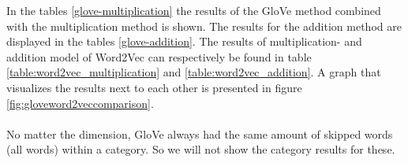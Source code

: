 
In the tables \ref{glove-multiplication} the results of the GloVe method combined with the multiplication method is shown. The results for the addition method are displayed in the tables \ref{glove-addition}. The results of multiplication- and addition model of Word2Vec can respectively be found in table \ref{table:word2vec_multiplication} and \ref{table:word2vec_addition}. A graph that visualizes the results next to each other is presented in figure \ref{fig:gloveword2veccomparison}.
\paragraph{}
No matter the dimension, GloVe always had the same amount of skipped words (all words) within a category. So we will not show the category results for these.
\label{sec:tabellen}
\begin{table}[H]
	\centering
	\hfill
\end{table}
